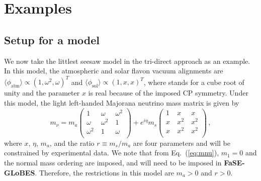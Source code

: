 \documentclass[aps,prd,nofootinbib,preprint]{revtex4}
\begin{document}
\section{Examples}
\subsection{Setup for a model}
We now take the littlest seesaw model in the tri-direct approach as an example. In this model, the atmospheric and solar flavon vacuum alignments are $\langle\phi_{\text{atm}}\rangle\propto\left(1, \omega^2, \omega\right)^T$ and $\langle\phi_{\text{sol}}\rangle\propto\left(1, x, x\right)^T$,
where  stands for a cube root of unity and the parameter $x$ is real because of the imposed CP symmetry. Under this model, the light left-handed Majorana neutrino mass matrix is given by
\begin{equation}
\label{eq:mnu}  m_{\nu}=m_{a}\begin{pmatrix}
 1 &~ \omega  &~ \omega ^2 \\
 \omega  &~ \omega ^2 &~ 1 \\
 \omega ^2 &~ 1 &~ \omega  \\
\end{pmatrix}+e^{i\eta}m_{s}
\begin{pmatrix}
 1 &~  x &~  x \\
 x &~ x^2 &~ x^2 \\
 x &~ x^2 &~ x^2 \\
\end{pmatrix}\,,
\end{equation}
where $x$, $\eta$, $m_a$, and the ratio $r\equiv m_s/m_a$ are four parameters and will be constrained by experimental data. We note that from Eq.~(\ref{eq:mnu}), $m_1=0$ and the normal mass ordering are imposed, and will need to be imposed in \textbf{FaSE-GLoBES}. Therefore, the restrictions in this model are $m_a>0$ and $r>0$.
\end{document}
